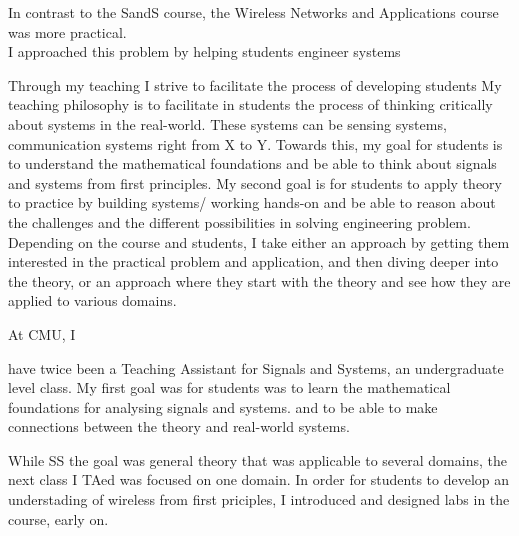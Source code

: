 \documentclass[10pt]{article}
\begin{document}
In contrast to the SandS course, the Wireless Networks and Applications course was more practical.\\
I approached this problem by helping students engineer systems 




Through my teaching 
I strive to facilitate the process of developing students 
My teaching philosophy is to facilitate in students the process of thinking critically about systems in the real-world. These systems can be sensing systems, communication systems right from X to Y. Towards this, my goal for students is to understand the mathematical foundations and be able to think about signals and systems from first principles. My second goal is for students to apply theory to practice by building systems/ working hands-on and be able to reason about the challenges and the different possibilities in solving engineering problem. Depending on the course and students, I take either an approach by getting them interested in the practical problem and application, and then diving deeper into the theory, or an approach where they start with the theory and see how they are applied to various domains.


At CMU, I 

have twice been a Teaching Assistant for Signals and Systems, an undergraduate level class. My first goal was for students was to learn the mathematical foundations for analysing signals and systems. and to be able to make connections between the theory and real-world systems. 


While SS the goal was general theory that was applicable to several domains, the next class I TAed was focused on one domain. 
In order for students to develop an understading of wireless from first priciples, I introduced and designed labs in the course, early on.\\
\end{document}
